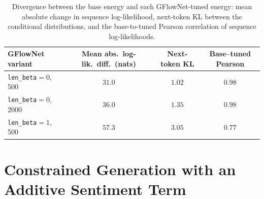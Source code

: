 \begin{table}[t]
    \centering
    \small
    \setlength{\tabcolsep}{4pt}
    \begin{tabular}{lccc}
        \toprule
        GFlowNet variant & Mean abs.\ log-lik.\ diff.\ (nats) & Next-token KL & Base--tuned Pearson \\
        \midrule
        \texttt{len\_beta}$=0$, 500  & $31.0$ & $1.02$ & $0.98$ \\
        \texttt{len\_beta}$=0$, 2000 & $36.0$ & $1.35$ & $0.98$ \\
        \texttt{len\_beta}$=1$, 500  & $57.3$ & $3.05$ & $0.77$ \\
        \bottomrule
    \end{tabular}
    \caption[Divergence between the base and GFlowNet-tuned energies.]{Divergence between the base energy and each GFlowNet-tuned energy: mean absolute change in sequence log-likelihood, next-token KL between the conditional distributions, and the base-to-tuned Pearson correlation of sequence log-likelihoods.}
    \label{tab:divergence}
\end{table}

\section{Constrained Generation with an Additive Sentiment Term}
\label{sec:results-constrained}

